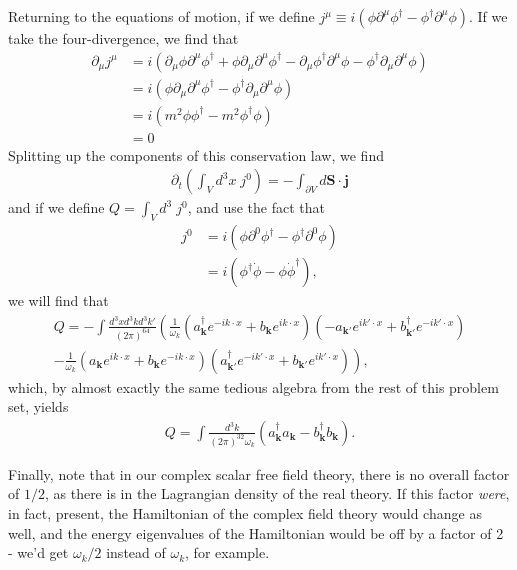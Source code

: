 \documentclass{mathnotes}
\begin{document}
Returning to the equations of motion, if we define $j^\mu\equiv i(\phi\partial^\mu\phi^\dagger-\phi^\dagger\partial^\mu\phi)$. If we take the four-divergence, we find that
\begin{align*}
    \partial_\mu j^\mu&=i\left( \partial_\mu\phi\partial^\mu\phi^\dagger+\phi\partial_\mu\partial^\mu\phi^\dagger-\partial_\mu\phi^\dagger\partial^\mu\phi-\phi^\dagger\partial_\mu\partial^\mu\phi \right)\\
    &=i\left( \phi\partial_\mu\partial^\mu\phi^\dagger-\phi^\dagger\partial_\mu\partial^\mu\phi \right)\\
    &=i\left( m^2\phi\phi^\dagger - m^2\phi^\dagger\phi \right)\\
    &=0
\end{align*}
Splitting up the components of this conservation law, we find
\begin{align*}
    \partial_t\left( \int_V d^3x\;j^0 \right)=-\int_{\partial V}d\mathbf{S}\cdot \mathbf{j}
\end{align*}
and if we define $Q=\int_Vd^3\;j^0$, and use the fact that
\begin{align*}
    j^0&=i\left( \phi\partial^0\phi^\dagger-\phi^\dagger\partial^0\phi \right)\\
    &=i\left( \phi^\dagger\dot{\phi}-\phi\dot{\phi}^\dagger \right),
\end{align*}
we will find that
\begin{align*}
    Q=-\int\frac{d^3xd^3kd^3k'}{(2\pi)^64}\left( \frac{1}{\omega_k}(a_\mathbf{k}^\dagger e^{-ik\cdot x}+b_\mathbf{k}e^{ik\cdot x})(-a_{\mathbf{k}'}e^{ik'\cdot x}+b_{\mathbf{k}'}^\dagger e^{-ik'\cdot x})\right.\\
    \left.-\frac{1}{\omega_k}(a_\mathbf{k}e^{ik\cdot x}+b_{\mathbf{k}}e^{-ik\cdot x})(a^\dagger_{\mathbf{k}'}e^{-ik'\cdot x}+b_{\mathbf{k}'}e^{ik'\cdot x}) \right),
\end{align*}
which, by almost exactly the same tedious algebra from the rest of this problem set, yields
\begin{align*}
    Q=\int\frac{d^3k}{(2\pi)^32\omega_k}(a^\dagger_\mathbf{k}a_\mathbf{k}-b^\dagger_\mathbf{k}b_\mathbf{k}).
\end{align*}

Finally, note that in our complex scalar free field theory, there is no overall factor of $1/2$, as there is in the Lagrangian density of the real theory. If this factor \textit{were}, in fact,
present, the Hamiltonian of the complex field theory would change as well, and the energy eigenvalues of the Hamiltonian would be off by a factor of 2 - we'd get $\omega_k/2$ instead of
$\omega_k$, for example.
\end{document}
